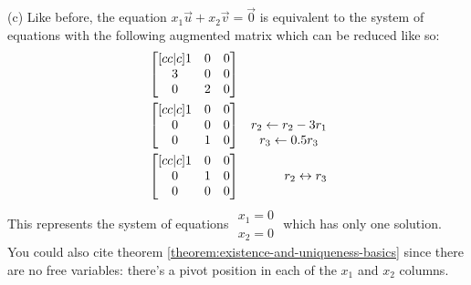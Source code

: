 \documentclass[11pt, letterpaper]{report}
\newenvironment{book}{}{}
\newcounter{theorem}[chapter]
\begin{document}
\begin{book}
(c) Like before, the equation $x_1\vec{u}+x_2\vec{v}=\vec{0}$ is equivalent to the system of equations with the following augmented matrix which can be reduced like so:
\begin{align*}
&\begin{bmatrix}[cc|c]
1 & 0 & 0 \\
3 & 0 & 0 \\
0 & 2 & 0
\end{bmatrix} \\
&\begin{bmatrix}[cc|c]
1 & 0 & 0 \\
0 & 0 & 0 \\
0 & 1 & 0
\end{bmatrix} &\begin{matrix} \rule{1em}{0pt} \\ r_2 \leftarrow r_2-3r_1 \\ r_3\leftarrow 0.5r_3\end{matrix} \\
&\begin{bmatrix}[cc|c]
1 & 0 & 0 \\
0 & 1 & 0 \\
0 & 0 & 0
\end{bmatrix} &\begin{matrix} \rule{1em}{0pt} \\ r_2 \leftrightarrow r_3 \\ \rule{1em}{0pt}\end{matrix} 
\end{align*}
This represents the system of equations $\begin{aligned}
x_1=0 \\ x_2=0
\end{aligned}$ which has only one solution. You could also cite theorem \ref{theorem:existence-and-uniqueness-basics} since there are no free variables: there's a pivot position in each of the $x_1$ and $x_2$ columns. \blacksquare
\end{book}
\end{document}
